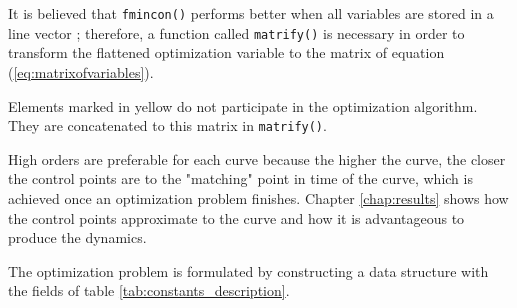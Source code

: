 \par It is believed that \texttt{fmincon()} performs better when all variables are stored in a line vector \cite{privateconversationendpoints}; therefore, a function called \texttt{matrify()} is necessary in order to transform the flattened optimization variable to the matrix of equation (\ref{eq:matrixofvariables}). 
\par Elements marked in yellow do not participate in the optimization algorithm. They are concatenated to this matrix in \texttt{matrify()}. 

\par High orders are preferable for each curve \cite{cichella2018bernstein} because the higher the curve, the closer the control points are to the "matching" point in time of the curve, which is achieved once an optimization problem finishes. Chapter \ref{chap:results} shows how the control points approximate to the curve and how it is advantageous to produce the dynamics.


\par The optimization problem is formulated by constructing a data structure with the fields of table \ref{tab:constants_description}.


